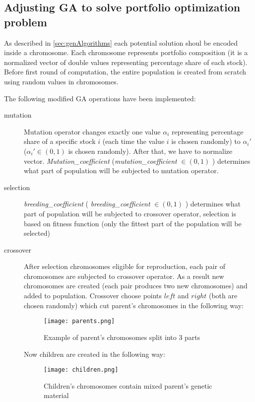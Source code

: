 \subsection{Adjusting GA to solve portfolio optimization problem}

As described in \ref{sec:genAlgorithms} each potential solution shoul be encoded inside a chromosome. 
Each chromosome represents portfolio composition (it is a normalized vector of double values representing percentage share of each stock).
Before first round of computation, the entire population is created from scratch using random values in chromosomes.

The following modified GA operations have been implemented:
\begin{description}
  \item [mutation]
      Mutation operator changes exactly one value $ \alpha_{i} $ representing percentage share of a specific stock $i$ (each time the value $i$ is chosen randomly)
      to $\alpha_{i}'$ ($\alpha_{i}' \in (0,1)$ is chosen randomly). 
      After that, we have to normalize vector.
      \emph{Mutation\_coefficient} (\emph{mutation\_coefficient} $ \in (0,1)$ ) determines what part of population will be subjected to mutation operator.
  \item [selection]
      \emph{breeding\_coefficient} ( \emph{breeding\_coefficient} $ \in (0,1)$ ) determines what part of population will be subjected to crossover operator, selection is based on 
      fitness function (only the fittest part of the population will be selected)
  \item [crossover]
      After selection chromosomes eligible for reproduction, each pair of chromosomes are subjected to crossover operator. As a result new chromosomes are created (each pair
      produces two new chromosomes) and added to population. Crossover choose points $left$  and $right$ (both are chosen randomly) which cut parent's chromosomes in the following
      way: 
	  \begin{figure}[H]
	    \begin{center}
	      \texttt{[image: parents.png]}
	    \end{center}
	    \caption{Example of parent's chromosomes split into 3 parts}
	  \end{figure}

	Now children are created in the following way:    
	  \begin{figure}[H]
	    \begin{center}
	      \texttt{[image: children.png]}
	    \end{center}
	    \caption{Children's chromosomes contain mixed parent's genetic material}
	  \end{figure}

\end{description}

